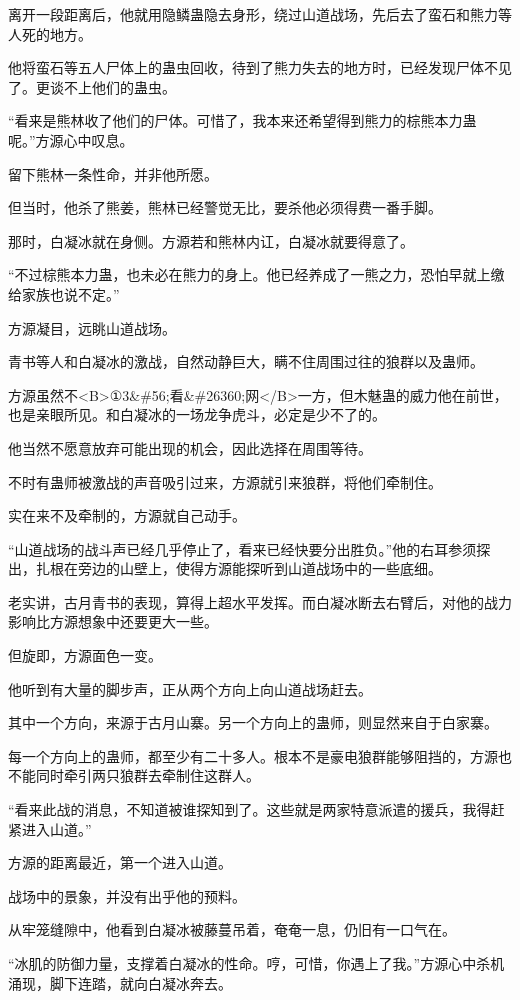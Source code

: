 \begin{this_body}
离开一段距离后，他就用隐鳞蛊隐去身形，绕过山道战场，先后去了蛮石和熊力等人死的地方。

他将蛮石等五人尸体上的蛊虫回收，待到了熊力失去的地方时，已经发现尸体不见了。更谈不上他们的蛊虫。

“看来是熊林收了他们的尸体。可惜了，我本来还希望得到熊力的棕熊本力蛊呢。”方源心中叹息。

留下熊林一条性命，并非他所愿。

但当时，他杀了熊姜，熊林已经警觉无比，要杀他必须得费一番手脚。

那时，白凝冰就在身侧。方源若和熊林内讧，白凝冰就要得意了。

“不过棕熊本力蛊，也未必在熊力的身上。他已经养成了一熊之力，恐怕早就上缴给家族也说不定。”

方源凝目，远眺山道战场。

青书等人和白凝冰的激战，自然动静巨大，瞒不住周围过往的狼群以及蛊师。

方源虽然不<B>①3\&\#56;看\&\#26360;网</B>一方，但木魅蛊的威力他在前世，也是亲眼所见。和白凝冰的一场龙争虎斗，必定是少不了的。

他当然不愿意放弃可能出现的机会，因此选择在周围等待。

不时有蛊师被激战的声音吸引过来，方源就引来狼群，将他们牵制住。

实在来不及牵制的，方源就自己动手。

“山道战场的战斗声已经几乎停止了，看来已经快要分出胜负。”他的右耳参须探出，扎根在旁边的山壁上，使得方源能探听到山道战场中的一些底细。

老实讲，古月青书的表现，算得上超水平发挥。而白凝冰断去右臂后，对他的战力影响比方源想象中还要更大一些。

但旋即，方源面色一变。

他听到有大量的脚步声，正从两个方向上向山道战场赶去。

其中一个方向，来源于古月山寨。另一个方向上的蛊师，则显然来自于白家寨。

每一个方向上的蛊师，都至少有二十多人。根本不是豪电狼群能够阻挡的，方源也不能同时牵引两只狼群去牵制住这群人。

“看来此战的消息，不知道被谁探知到了。这些就是两家特意派遣的援兵，我得赶紧进入山道。”

方源的距离最近，第一个进入山道。

战场中的景象，并没有出乎他的预料。

从牢笼缝隙中，他看到白凝冰被藤蔓吊着，奄奄一息，仍旧有一口气在。

“冰肌的防御力量，支撑着白凝冰的性命。哼，可惜，你遇上了我。”方源心中杀机涌现，脚下连踏，就向白凝冰奔去。


\end{this_body}
